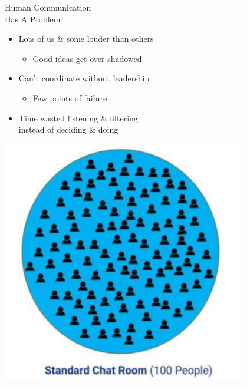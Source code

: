 \documentclass[aspectratio=35]{beamer} %
\begin{document}
\begin{frame}{Human Communication\\Has A Problem}
\vspace{-0.5in}
\begin{itemize}
    \item Lots of us \& some louder than others
    \begin{itemize}
        \item Good ideas get over-shadowed
    \end{itemize}
    \item Can't coordinate without leadership
    \begin{itemize}
        \item Few points of failure
    \end{itemize}
    \item Time wasted listening \& filtering\\instead of deciding \& doing
\end{itemize}
\centering
\includegraphics[width=0.8\textwidth]{imgs/CSI_section/standard_chat_room.png}
\end{frame}
\end{document}
